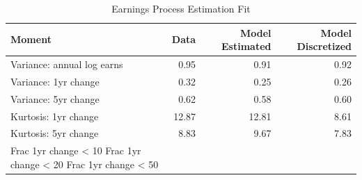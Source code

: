 \begin{table}
\caption{Earnings Process Estimation Fit}
\label{tab:earnings_fit}
\begin{tabular}{lrrr}
\toprule
Moment & Data & Model Estimated & Model Discretized \\
\midrule
Variance: annual log earns & 0.95 & 0.91 & 0.92 \\
Variance: 1yr change & 0.32 & 0.25 & 0.26 \\
Variance: 5yr change & 0.62 & 0.58 & 0.60 \\
Kurtosis: 1yr change & 12.87 & 12.81 & 8.61 \\
Kurtosis: 5yr change & 8.83 & 9.67 & 7.83 \\
Frac 1yr change < 10%
Frac 1yr change < 20%
Frac 1yr change < 50%
\bottomrule
\end{tabular}
\end{table}
